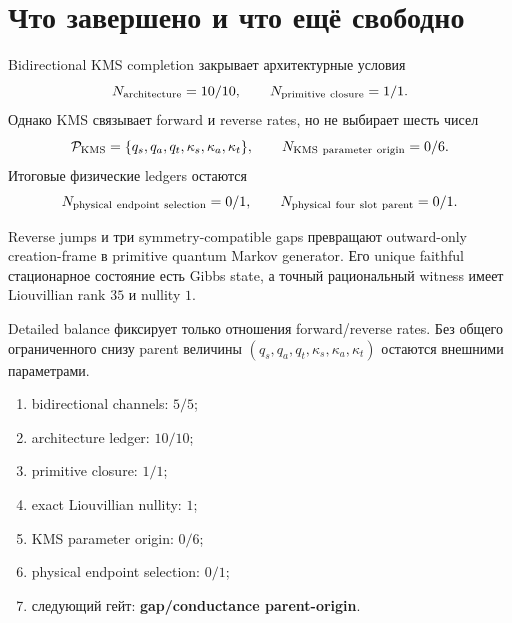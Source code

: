 \section{Что завершено и что ещё свободно}

Bidirectional KMS completion закрывает архитектурные условия
\begin{equation}
 N_{\rm architecture}=10/10,
 \qquad N_{\rm primitive\ closure}=1/1.
 \label{eq:v9-kms-completion-architecture-ledger}
\end{equation}
Однако KMS связывает forward и reverse rates, но не выбирает шесть чисел
\begin{equation}
 \mathcal P_{\rm KMS}=\{q_s,q_a,q_t,\kappa_s,\kappa_a,\kappa_t\},
 \qquad N_{\rm KMS\ parameter\ origin}=0/6.
 \label{eq:v9-kms-completion-free-parameters}
\end{equation}
Итоговые физические ledgers остаются
\begin{equation}
 N_{\rm physical\ endpoint\ selection}=0/1,
 \qquad N_{\rm physical\ four\ slot\ parent}=0/1.
 \label{eq:v9-kms-completion-physical-ledgers}
\end{equation}

\begin{theorem}
Reverse jumps и три symmetry-compatible gaps превращают outward-only
creation-frame в primitive quantum Markov generator. Его unique faithful
стационарное состояние есть Gibbs state, а точный рациональный witness имеет
Liouvillian rank $35$ и nullity $1$.
\end{theorem}

\begin{nogocriterion}
Detailed balance фиксирует только отношения forward/reverse rates.
Без общего ограниченного снизу parent величины
$(q_s,q_a,q_t,\kappa_s,\kappa_a,\kappa_t)$ остаются внешними параметрами.
\end{nogocriterion}

\begin{protocol}\begin{enumerate}
\item bidirectional channels: \textbf{$5/5$};
\item architecture ledger: \textbf{$10/10$};
\item primitive closure: \textbf{$1/1$};
\item exact Liouvillian nullity: \textbf{$1$};
\item KMS parameter origin: \textbf{$0/6$};
\item physical endpoint selection: \textbf{$0/1$};
\item следующий гейт: \textbf{gap/conductance parent-origin}.
\end{enumerate}\end{protocol}

